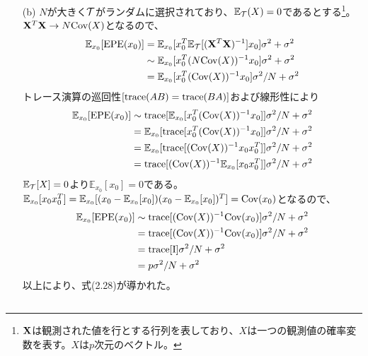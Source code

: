 \documentclass{jsarticle}
\begin{document}
\begin{enumerate}
\item[(b)]
$N$が大きく${\cal T}$がランダムに選択されており、$\mathbb{E}_{\cal T}(X)=0$であるとする\footnote{${\bf X}$は観測された値を行とする行列を表しており、$X$は一つの観測値の確率変数を表す。$X$は$p$次元のベクトル。}。${\bf X}^T{\bf X}\to N{\rm Cov}(X)$となるので、
\begin{align*}
\mathbb{E}_{x_0}[{\rm EPE}(x_0)]&=\mathbb{E}_{x_0}[x_0^T \mathbb{E}_{\cal T}[({\bf X}^T{\bf X})^{-1}]x_0]\sigma^2+\sigma^2\\
&\sim\mathbb{E}_{x_0}[x_0^T (N{\rm Cov}(X))^{-1}x_0]\sigma^2+\sigma^2\\
&=\mathbb{E}_{x_0}[x_0^T ({\rm Cov}(X))^{-1}x_0]\sigma^2/N+\sigma^2
\end{align*}
トレース演算の巡回性$[{\rm trace}(AB)={\rm trace}(BA)]$および線形性により
\begin{align*}
\mathbb{E}_{x_0}[{\rm EPE}(x_0)]&\sim{\rm trace}[\mathbb{E}_{x_0}[x_0^T ({\rm Cov}(X))^{-1}x_0]]\sigma^2/N+\sigma^2\\
&=\mathbb{E}_{x_0}[{\rm trace}[x_0^T ({\rm Cov}(X))^{-1}x_0]]\sigma^2/N+\sigma^2\\
&=\mathbb{E}_{x_0}[{\rm trace}[ ({\rm Cov}(X))^{-1}x_0x_0^T]]\sigma^2/N+\sigma^2\\
&={\rm trace}[ ({\rm Cov}(X))^{-1}\mathbb{E}_{x_0}[x_0x_0^T]]\sigma^2/N+\sigma^2
\end{align*}
$\mathbb{E}_{\cal T}[X]=0$より$\mathbb{E}_{x_0}[x_0]=0$である。$\mathbb{E}_{x_0}[x_0x_0^T]=\mathbb{E}_{x_0}[(x_0-\mathbb{E}_{x_0}[x_0])(x_0-\mathbb{E}_{x_0}[x_0])^T]={\rm Cov}(x_0)$となるので、
\begin{align*}
\mathbb{E}_{x_0}[{\rm EPE}(x_0)]&\sim{\rm trace}[ ({\rm Cov}(X))^{-1}{\rm Cov}(x_0)]\sigma^2/N+\sigma^2\\
&={\rm trace}[ ({\rm Cov}(X))^{-1}{\rm Cov}(x_0)]\sigma^2/N+\sigma^2\\
&={\rm trace}[{\rm I}]\sigma^2/N+\sigma^2\\
&=p\sigma^2/N+\sigma^2
\end{align*}
以上により、式(2.28)が導かれた。
\end{enumerate}







\subsection{}

\subsection{}
\end{document}
